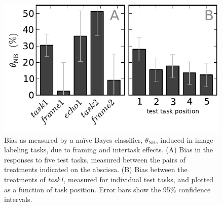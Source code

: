 \documentclass[12pt]{article}
\begin{document}
\begin{figure}
	\centering
	\includegraphics[scale=1]{figs/theta.pdf}
	\caption{
		Bias as measured by a na\"ive Bayes classifier, $\theta_\mathrm{NB}$,
		induced in image-labeling tasks, due to framing and 
		intertask effects. 
		(A) Bias in the responses to five test tasks,
		measured between the pairs of treatments indicated on the abscissa.  
		(B) Bias between the treatments of \textit{task1}, 
		measured for individual test tasks, and plotted as a function of 
		task position.  Error bars show the 95\% confidence intervals.
	}
	\label{fig:theta}
\end{figure}
\end{document}
